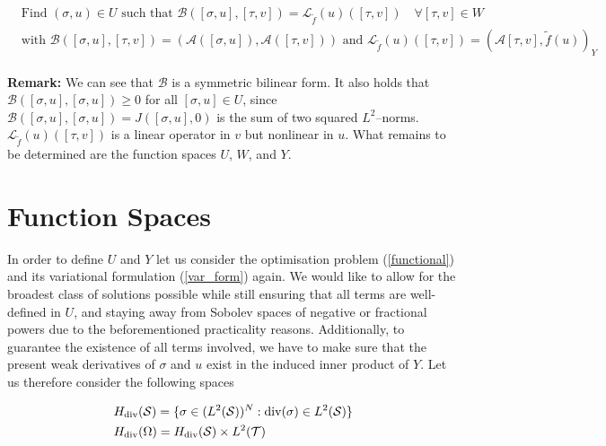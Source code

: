 \documentclass[../draft_1.tex]{subfiles}
\begin{document}
\begin{ceqn}
	\begin{align}
	\begin{aligned}
	\label{var_form}
	\text{ Find } (\sigma, u) \in U \text{ such that } \mathcal{B} ([\sigma, u], [\tau, v]) = \mathcal{L}_{\tilde{f}}(u)([\tau,v]) \quad \forall [\tau, v] \in W \\
 \text{ with } \mathcal{B} ([\sigma, u], [\tau, v]) = (\mathcal{A} ([\sigma, u]),  \mathcal{A} ([\tau, v])) \text{ and } \mathcal{L}_{\tilde{f}}(u)([\tau,v]) = (\mathcal{A}[\tau,v], \tilde{f}(u))_Y
\end{aligned}
	\end{align}
\end{ceqn}
\textbf{Remark:} We can see that $\mathcal{B} $ is a symmetric bilinear form. It also holds that $ \mathcal{B} ([\sigma, u], [\sigma, u]) \geq 0 $ for all $[\sigma, u] \in U$, since $ \mathcal{B} ([\sigma, u], [\sigma, u]) = J([\sigma, u], 0)$ is the sum of two squared $L^2$--norms. $\mathcal{L}_{\tilde{f}}(u)([\tau,v])$ is a linear operator in $v$ but nonlinear in $u$. What remains to be determined are the function spaces $U$, $W$, and $Y$. 

\section{Function Spaces}

In order to define $U$ and $Y$ let us consider the optimisation problem (\ref{functional}) and its variational formulation (\ref{var_form}) again. We would like to allow for the broadest class of solutions possible while still ensuring that all terms are well-defined in $U$, and staying away from Sobolev spaces of negative or fractional powers due to the beforementioned practicality reasons. Additionally, to guarantee the existence of all terms involved, we have to make sure that the present weak derivatives of $\sigma$ and $u$ exist in the induced inner product of $Y$. Let us therefore consider the following spaces 
\begin{ceqn}
	\begin{align}
	&H_{\mathop{}\!\mathrm{div}}(\mathcal{S}) = \{\sigma \in (L^2(\mathcal{S}))^N : \mathop{}\!\mathrm{div} (\sigma) \in L^2(\mathcal{S})\} \\
    &H_{\mathop{}\!\mathrm{div}}(\Omega) = H_{\mathop{}\!\mathrm{div}}(\mathcal{S}) \times L^2(\mathcal{T}) 
    	\end{align}
\end{ceqn}
\end{document}
